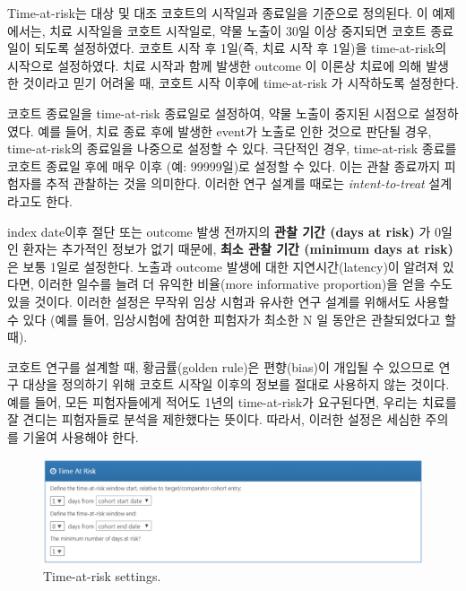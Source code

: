 \documentclass[11pt]{book}
\theoremstyle{definition}
\theoremstyle{definition}
\theoremstyle{definition}
\theoremstyle{remark}
\let\BeginKnitrBlock\begin \let\EndKnitrBlock\end
\begin{document}
Time-at-risk는 대상 및 대조 코호트의 시작일과 종료일을 기준으로
정의된다. 이 예제에서는, 치료 시작일을 코호트 시작일로, 약물 노출이 30일
이상 중지되면 코호트 종료일이 되도록 설정하였다. 코호트 시작 후 1일(즉,
치료 시작 후 1일)을 time-at-risk의 시작으로 설정하였다. 치료 시작과 함께
발생한 outcome 이 이론상 치료에 의해 발생한 것이라고 믿기 어려울 때,
코호트 시작 이후에 time-at-risk 가 시작하도록 설정한다.

코호트 종료일을 time-at-risk 종료일로 설정하여, 약물 노출이 중지된
시점으로 설정하였다. 예를 들어, 치료 종료 후에 발생한 event가 노출로
인한 것으로 판단될 경우, time-at-risk의 종료일을 나중으로 설정할 수
있다. 극단적인 경우, time-at-risk 종료를 코호트 종료일 후에 매우 이후
(예: 99999일)로 설정할 수 있다. 이는 관찰 종료까지 피험자를 추적
관찰하는 것을 의미한다. 이러한 연구 설계를 때로는 \emph{intent-to-treat}
설계라고도 한다.

index date이후 절단 또는 outcome 발생 전까지의 \textbf{관찰 기간 (days
at risk)} 가 0일인 환자는 추가적인 정보가 없기 때문에, \textbf{최소 관찰
기간 (minimum days at risk)} 은 보통 1일로 설정한다. 노출과 outcome
발생에 대한 지연시간(latency)이 알려져 있다면, 이러한 일수를 늘려 더
유익한 비율(more informative proportion)을 얻을 수도 있을 것이다. 이러한
설정은 무작위 임상 시험과 유사한 연구 설계를 위해서도 사용할 수 있다
(예를 들어, 임상시험에 참여한 피험자가 최소한 N 일 동안은 관찰되었다고
할 때).

\BeginKnitrBlock{rmdimportant}
코호트 연구를 설계할 때, 황금률(golden rule)은 편향(bias)이 개입될 수
있으므로 연구 대상을 정의하기 위해 코호트 시작일 이후의 정보를 절대로
사용하지 않는 것이다. 예를 들어, 모든 피험자들에게 적어도 1년의
time-at-risk가 요구된다면, 우리는 치료를 잘 견디는 피험자들로 분석을
제한했다는 뜻이다. 따라서, 이러한 설정은 세심한 주의를 기울여 사용해야
한다.
\EndKnitrBlock{rmdimportant}

\begin{figure}

{\centering \includegraphics[width=1\linewidth]{images/PopulationLevelEstimation/timeAtRisk} 

}

\caption{Time-at-risk settings.}\label{fig:timeAtRisk}
\end{figure}
\end{document}
